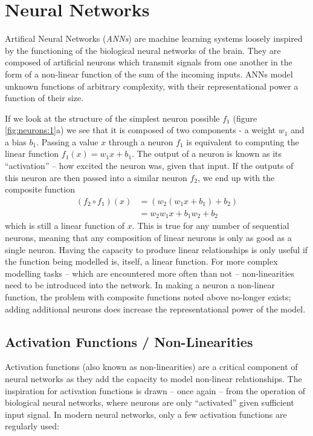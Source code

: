 \documentclass{report}
\begin{document}
\section{Neural Networks}
Artifical Neural Networks (\textit{ANNs}) are machine learning systems loosely inspired by the functioning of the biological neural networks of the brain. They are composed of artificial neurons which transmit signals from one another in the form of a non-linear function of the sum of the incoming inputs. ANNs model unknown functions of arbitrary complexity, with their representational power a function of their size. \par
If we look at the structure of the simplest neuron possible $f_1$ (figure \ref{fig:neurons:1}a) we see that it is composed of two components - a weight $w_1$ and a bias $b_1$. Passing a value $x$ through a neuron $f_1$ is equivalent to computing the linear function $f_1(x) = w_1x + b_1$. The output of a neuron is known as its ``activation'' -- how excited the neuron was, given that input.
If the outputs of this neuron are then passed into a similar neuron $f_2$, we end up with the composite function
\begin{align}
 (f_2\circ f_1)(x) & = (w_2(w_1x + b_1) + b_2) \\
                   & = w_2w_1x + b_1w_2 + b_2
\end{align}
which is still a linear function of $x$. This is true for any number of sequential neurons, meaning that any composition of linear neurons is only as good as a single neuron. Having the capacity to produce linear relationships is only useful if the function being modelled is, itself, a linear function. For more complex modelling tasks -- which are encountered more often than not -- non-linearities need to be introduced into the network. In making a neuron a non-linear function, the problem with composite functions noted above no-longer exists; adding additional neurons does increase the representational power of the model. \par

\subsection{Activation Functions / Non-Linearities}
Activation functions (also known as non-linearities) are a critical component of neural networks as they add the capacity to model non-linear relationships. The inspiration for activation functions is drawn -- once again -- from the operation of biological neural networks, where neurons are only ``activated'' given sufficient input signal. In modern neural networks, only a few activation functions are regularly used: \par
\end{document}
